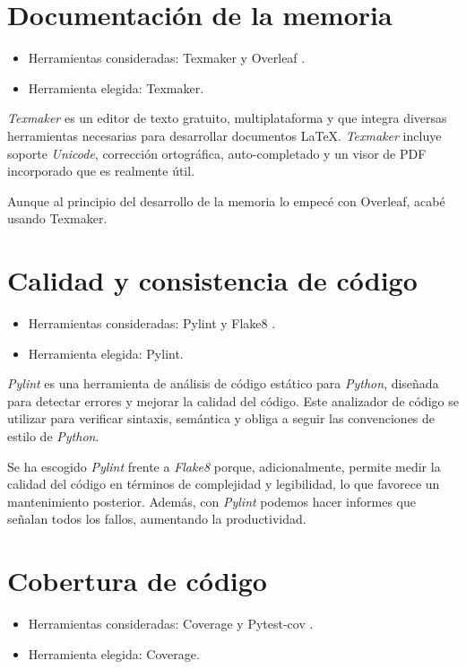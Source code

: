 \section{Documentación de la memoria}\label{editor_texto}
\begin{itemize}
\tightlist
\item
  Herramientas consideradas: Texmaker \citep{online:texmaker} y Overleaf \citep{online:overleaf}.
\item
  Herramienta elegida: Texmaker. 
\end{itemize}

\emph{Texmaker} es un editor de texto gratuito, multiplataforma y que integra diversas
herramientas necesarias para desarrollar documentos \LaTeX. \emph{Texmaker} incluye soporte 
\emph{Unicode}, corrección ortográfica, auto-completado y un visor de PDF incorporado que es
realmente útil. 

Aunque al principio del desarrollo de la memoria lo empecé con Overleaf, acabé usando Texmaker. 



\section{Calidad y consistencia de código}\label{calidad_codigo}
\begin{itemize}
\tightlist
\item
  Herramientas consideradas: Pylint \citep{online:pylint} y Flake8 \citep{online:flake8}.
\item
  Herramienta elegida: Pylint.
\end{itemize}

\emph{Pylint} es una herramienta de análisis de código estático para \emph{Python}, 
diseñada para detectar errores y mejorar la calidad del código. Este analizador de código se
utilizar para verificar sintaxis, semántica y obliga a seguir las convenciones de estilo
de \emph{Python}. 

Se ha escogido \emph{Pylint} frente a \emph{Flake8} porque, adicionalmente, permite medir la calidad del código en términos de complejidad y legibilidad, lo que favorece un mantenimiento posterior. Además, con \emph{Pylint} podemos hacer informes que señalan todos los fallos, 
aumentando la productividad.


\section{Cobertura de código}\label{cobertura_codigo}
\begin{itemize}
\tightlist
\item
  Herramientas consideradas: Coverage  \citep{online:coverage} y Pytest-cov \citep{online:pytest_cov}.
\item
  Herramienta elegida: Coverage.
\end{itemize}


